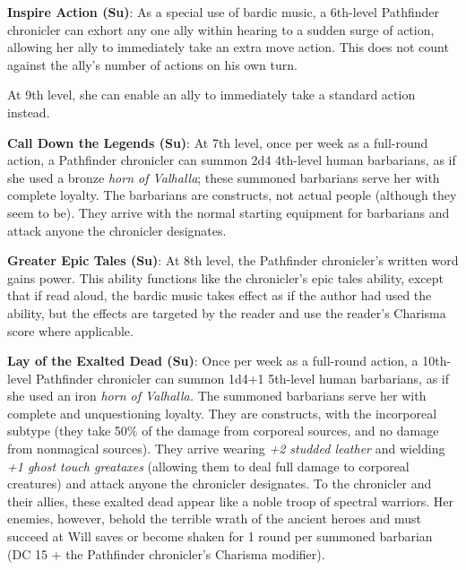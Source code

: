 \textbf{Inspire Action (Su)}: As a special use of bardic music, a 6th-level Pathfinder chronicler can exhort any one ally within hearing to a sudden surge of action, allowing her ally to immediately take an extra move action. This does not count against the ally's number of actions on his own turn.
				
At 9th level, she can enable an ally to immediately take a standard action instead. 
				
\textbf{Call Down the Legends (Su)}: At 7th level, once per week as a full-round action, a Pathfinder chronicler can summon 2d4 4th-level human barbarians, as if she used a bronze \textit{horn of Valhalla}; these summoned barbarians serve her with complete loyalty. The barbarians are constructs, not actual people (although they seem to be). They arrive with the normal starting equipment for barbarians and attack anyone the chronicler designates.
				
\textbf{Greater Epic Tales (Su)}: At 8th level, the Pathfinder chronicler's written word gains power. This ability functions like the chronicler's epic tales ability, except that if read aloud, the bardic music takes effect as if the author had used the ability, but the effects are targeted by the reader and use the reader's Charisma score where applicable. 
				
\textbf{Lay of the Exalted Dead (Su)}: Once per week as a full-round action, a 10th-level Pathfinder chronicler can summon 1d4+1 5th-level human barbarians, as if she used an iron \textit{horn of Valhalla.} The summoned barbarians serve her with complete and unquestioning loyalty. They are constructs, with the incorporeal subtype (they take 50\% of the damage from corporeal sources, and no damage from nonmagical sources). They arrive wearing \textit{+2 studded leather }and wielding \textit{+1 ghost touch greataxes} (allowing them to deal full damage to corporeal creatures) and attack anyone the chronicler designates. To the chronicler and their allies, these exalted dead appear like a noble troop of spectral warriors. Her enemies, however, behold the terrible wrath of the ancient heroes and must succeed at Will saves or become shaken for 1 round per summoned barbarian (DC 15 + the Pathfinder chronicler's Charisma modifier).
        	
